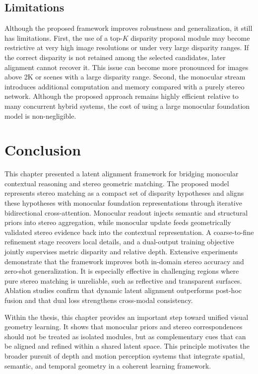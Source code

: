 \subsection{Limitations}
Although the proposed framework improves robustness and generalization, it still has limitations.
First, the use of a top-$K$ disparity proposal module may become restrictive at very high image resolutions or under very large disparity ranges.
If the correct disparity is not retained among the selected candidates, later alignment cannot recover it.
This issue can become more pronounced for images above 2K or scenes with a large disparity range.
Second, the monocular stream introduces additional computation and memory compared with a purely stereo network.
Although the proposed approach remains highly efficient relative to many concurrent hybrid systems, the cost of using a large monocular foundation model is non-negligible.

\section{Conclusion}
This chapter presented a latent alignment framework for bridging monocular contextual reasoning and stereo geometric matching.
The proposed model represents stereo matching as a compact set of disparity hypotheses and aligns these hypotheses with monocular foundation representations through iterative bidirectional cross-attention.
Monocular readout injects semantic and structural priors into stereo aggregation, while monocular update feeds geometrically validated stereo evidence back into the contextual representation. 
A coarse-to-fine refinement stage recovers local details, and a dual-output training objective jointly supervises metric disparity and relative depth.
Extensive experiments demonstrate that the framework improves both in-domain stereo accuracy and zero-shot generalization. 
It is especially effective in challenging regions where pure stereo matching is unreliable, such as reflective and transparent surfaces. 
Ablation studies confirm that dynamic latent alignment outperforms post-hoc fusion and that dual loss strengthens cross-modal consistency.

Within the thesis, this chapter provides an important step toward unified visual geometry learning.
It shows that monocular priors and stereo correspondences should not be treated as isolated modules, but as complementary cues that can be aligned and refined within a shared latent space.
This principle motivates the broader pursuit of depth and motion perception systems that integrate spatial, semantic, and temporal geometry in a coherent learning framework.